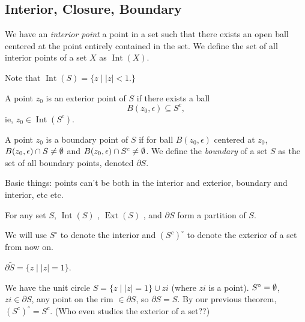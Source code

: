 \subsection{Interior, Closure, Boundary}
\begin{definition}
    We have an \emph{interior point} a point in a set such that there exists an open ball centered at the point entirely contained in the set. We define the set of all interior points of a set $X$ as $\operatorname{Int}(X)$.
\end{definition}
    Note that $\operatorname{Int}(S)= \{z  \mid |z|<1.\} $
\begin{definition}
    A point $z_0$ is an exterior point of $S$ if there exists a ball  \[
        B(z_0, \epsilon) \subseteq S^{c},
    \]
    ie, $z_0\in \operatorname{Int}(S^{c}).$ 
\end{definition}
\begin{definition}
    A point $z_0$ is a boundary point of $S$ if for ball $B(z_0,\epsilon)$ centered at $z_0$, $B(z_0,\epsilon)\cap S \neq \emptyset$ and $B(z_0,\epsilon)\cap S^{c} \neq \emptyset$. We define the \emph{boundary} of a set $S$ as the set of all boundary points, denoted $\partial S$.
\end{definition}
Basic things: points can't be both in the interior and exterior, boundary and interior, etc etc.
\begin{theorem}
    For any set $S$, $\operatorname{Int}(S)$ , $\operatorname{Ext}(S)$ , and $\partial S$ form a partition of $S$.
\end{theorem}
We will use  $S^{\circ}$ to denote the interior and $(S^{c})^{\circ}$ to denote the exterior of a set from now on.
\begin{example}
    $\partial \widetilde{S} = \{z  \mid  |z|=1\} $.
\end{example}
\begin{example}
    We have the unit circle $S = \{z  \mid  |z|=1\} \cup zi$ (where $zi$ is a point). $S^{\circ}=\emptyset$, $zi \in \partial S$, any point on the rim  $\in \partial S$, so $\partial S = S$. By our previous theorem, $(S^{c})^{\circ}=S^{c}.$ (Who even studies the exterior of a set??)
\end{example}

